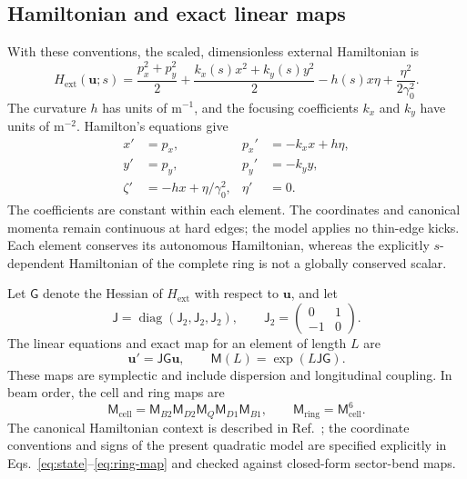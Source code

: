 \documentclass[11pt,a4paper]{article}
\numberwithin{equation}{section}
\newcommand{\mat}[1]{\mathsf{#1}}
\begin{document}
\subsection{Hamiltonian and exact linear maps}

With these conventions, the scaled, dimensionless external Hamiltonian is
\begin{equation}
  H_{\mathrm{ext}}(\mathbf u;s)
  =\frac{p_x^2+p_y^2}{2}
   +\frac{k_x(s)x^2+k_y(s)y^2}{2}
   -h(s)x\eta+\frac{\eta^2}{2\gamma_0^2}.
  \label{eq:external-hamiltonian}
\end{equation}
The curvature $h$ has units of $\mathrm{m^{-1}}$, and the focusing
coefficients $k_x$ and $k_y$ have units of $\mathrm{m^{-2}}$. Hamilton's
equations give
\begin{equation}
  \begin{aligned}
    x'&=p_x,                 & p_x'&=-k_xx+h\eta,\\
    y'&=p_y,                 & p_y'&=-k_yy,\\
    \zeta'&=-hx+\eta/\gamma_0^2, & \eta'&=0.
  \end{aligned}
  \label{eq:hamilton-equations}
\end{equation}
The coefficients are constant within each element. The coordinates and
canonical momenta remain continuous at hard edges; the model applies no
thin-edge kicks. Each element conserves its autonomous Hamiltonian,
whereas the explicitly $s$-dependent Hamiltonian of the complete ring is
not a globally conserved scalar.

Let $\mat G$ denote the Hessian of $H_{\mathrm{ext}}$ with respect to
$\mathbf u$, and let
\begin{equation}
  \mat J=\operatorname{diag}(\mat J_2,\mat J_2,\mat J_2),\qquad
  \mat J_2=\begin{pmatrix}0&1\\-1&0\end{pmatrix}.
  \label{eq:symplectic-form}
\end{equation}
The linear equations and exact map for an element of length $L$ are
\begin{equation}
  \mathbf u'=\mat J\mat G\mathbf u,\qquad
  \mat M(L)=\exp(L\mat J\mat G).
  \label{eq:element-map}
\end{equation}
These maps are symplectic and include dispersion and longitudinal
coupling. In beam order, the cell and ring maps are
\begin{equation}
  \mat M_{\mathrm{cell}}
    =\mat M_{B2}\mat M_{D2}\mat M_Q\mat M_{D1}\mat M_{B1},\qquad
  \mat M_{\mathrm{ring}}=\mat M_{\mathrm{cell}}^6.
  \label{eq:ring-map}
\end{equation}
The canonical Hamiltonian context is described in Ref.~\cite{tracking};
the coordinate conventions and signs of the present quadratic model are
specified explicitly in Eqs.~\eqref{eq:state}--\eqref{eq:ring-map} and
checked against closed-form sector-bend maps.
\end{document}
